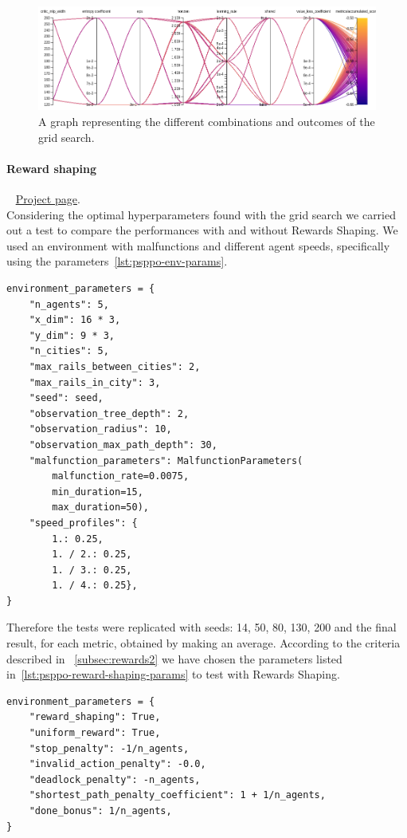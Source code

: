 \documentclass[11pt, a4paper, hidelinks]{report}
\begin{document}
\begin{figure}
\centering
\includegraphics[width=1.0\textwidth]{resources/psppo_sweep.png}
\caption{A graph representing the different combinations and outcomes of the grid search.}
\label{fig:psppo_sweep}
\end{figure}
\newpage

\paragraph{Reward shaping}\label{par:psppo_reward_shaping}
~\newline
\href{https://wandb.ai/fiorenzoparascandolo/flatland-challenge-ps-ppo-test}{Project page}.\\

Considering the optimal hyperparameters found with the grid search we carried out a test to compare the performances with and without Rewards Shaping.
We used an environment with malfunctions and different agent speeds, specifically using the parameters~\ref{lst:psppo-env-params}.

\begin{lstlisting}[label={lst:psppo-env-params}]
environment_parameters = {
	"n_agents": 5,
	"x_dim": 16 * 3,
	"y_dim": 9 * 3,
	"n_cities": 5,
	"max_rails_between_cities": 2,
	"max_rails_in_city": 3,
	"seed": seed,
	"observation_tree_depth": 2,
	"observation_radius": 10,
	"observation_max_path_depth": 30,
	"malfunction_parameters": MalfunctionParameters(
		malfunction_rate=0.0075,
		min_duration=15,
		max_duration=50),
	"speed_profiles": {
		1.: 0.25,
		1. / 2.: 0.25,
		1. / 3.: 0.25,
		1. / 4.: 0.25},
}
\end{lstlisting}

Therefore the tests were replicated with seeds: 14, 50, 80, 130, 200 and the final result, for each metric, obtained by making an average.
According to the criteria described in ~\ref{subsec:rewards2} we have chosen the parameters listed in~\ref{lst:psppo-reward-shaping-params} to test with Rewards Shaping.

\begin{lstlisting}[label={lst:psppo-reward-shaping-params}]
environment_parameters = {
	"reward_shaping": True,
	"uniform_reward": True,
	"stop_penalty": -1/n_agents,
	"invalid_action_penalty": -0.0,
	"deadlock_penalty": -n_agents,
	"shortest_path_penalty_coefficient": 1 + 1/n_agents,
	"done_bonus": 1/n_agents,
}
\end{lstlisting}
\end{document}
